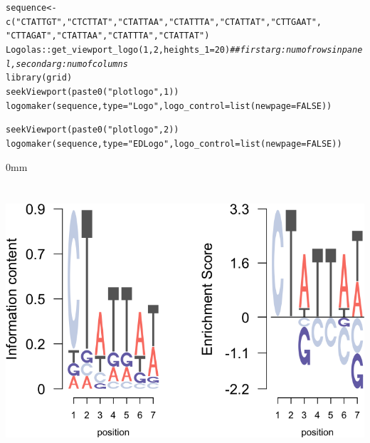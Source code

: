 \documentclass[12pt]{article}\usepackage[]{graphicx}\usepackage[usenames,dvipsnames]{color}
\newcommand{\hlnum}[1]{\textcolor[rgb]{0.816,0.125,0.439}{#1}}%
\newcommand{\hlstr}[1]{\textcolor[rgb]{0.251,0.627,0.251}{#1}}%
\newcommand{\hlcom}[1]{\textcolor[rgb]{0.502,0.502,0.502}{\textit{#1}}}%
\newcommand{\hlopt}[1]{\textcolor[rgb]{0,0,0}{#1}}%
\newcommand{\hlstd}[1]{\textcolor[rgb]{0.251,0.251,0.251}{#1}}%
\newcommand{\hlkwb}[1]{\textcolor[rgb]{0,0,0}{#1}}%
\newcommand{\hlkwc}[1]{\textcolor[rgb]{0.251,0.251,0.251}{#1}}%
\newcommand{\hlkwd}[1]{\textcolor[rgb]{0.878,0.439,0.125}{#1}}%
\newenvironment{knitrout}{}{} %
\begin{document}
\begin{knitrout}
\color{fgcolor}\begin{kframe}
\begin{alltt}
\hlstd{sequence} \hlkwb{<-} \hlkwd{c}\hlstd{(}\hlstr{"CTATTGT"}\hlstd{,} \hlstr{"CTCTTAT"}\hlstd{,} \hlstr{"CTATTAA"}\hlstd{,} \hlstr{"CTATTTA"}\hlstd{,} \hlstr{"CTATTAT"}\hlstd{,} \hlstr{"CTTGAAT"}\hlstd{,}
              \hlstr{"CTTAGAT"}\hlstd{,} \hlstr{"CTATTAA"}\hlstd{,} \hlstr{"CTATTTA"}\hlstd{,} \hlstr{"CTATTAT"}\hlstd{)}
\hlstd{Logolas}\hlopt{::}\hlkwd{get_viewport_logo}\hlstd{(}\hlnum{1}\hlstd{,} \hlnum{2}\hlstd{,} \hlkwc{heights_1} \hlstd{=} \hlnum{20}\hlstd{)} \hlcom{## first arg: num of rows in panel, second arg: num of columns}
\hlkwd{library}\hlstd{(grid)}
\hlkwd{seekViewport}\hlstd{(}\hlkwd{paste0}\hlstd{(}\hlstr{"plotlogo"}\hlstd{,} \hlnum{1}\hlstd{))}
\hlkwd{logomaker}\hlstd{(sequence,} \hlkwc{type} \hlstd{=} \hlstr{"Logo"}\hlstd{,} \hlkwc{logo_control} \hlstd{=} \hlkwd{list}\hlstd{(}\hlkwc{newpage} \hlstd{=} \hlnum{FALSE}\hlstd{))}

\hlkwd{seekViewport}\hlstd{(}\hlkwd{paste0}\hlstd{(}\hlstr{"plotlogo"}\hlstd{,} \hlnum{2}\hlstd{))}
\hlkwd{logomaker}\hlstd{(sequence,} \hlkwc{type} \hlstd{=} \hlstr{"EDLogo"}\hlstd{,} \hlkwc{logo_control} \hlstd{=} \hlkwd{list}\hlstd{(}\hlkwc{newpage} \hlstd{=} \hlnum{FALSE}\hlstd{))}
\end{alltt}
\end{kframe}\begin{adjustwidth}{\fltoffset}{0mm}

\includegraphics[width=6in,height=4in]{figure/mult_panels-1} \hfill{}

\end{adjustwidth}
\end{knitrout}
\end{document}
